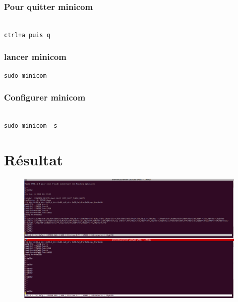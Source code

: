 \documentclass{article}
\begin{document}
\subsubsection{Pour quitter minicom}


\begin{verbatim}

ctrl+a puis q
\end{verbatim}

\subsubsection{lancer minicom}
\begin{verbatim}
sudo minicom

\end{verbatim}


\subsubsection{Configurer minicom}
\begin{verbatim}

sudo minicom -s
\end{verbatim}

\section{Résultat}
\begin{figure}[H]
\begin{center}
\advance\leftskip-3cm
\advance\rightskip-3cm
\includegraphics[keepaspectratio=true,scale=0.4]{minicom_loramac.png}
\label{visina8}
\end{center}\end{figure}
\end{document}
